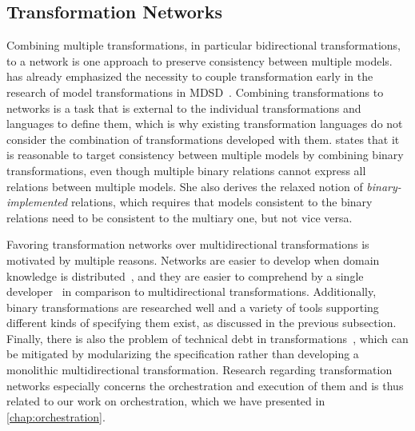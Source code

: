 \subsection{Transformation Networks}

Combining multiple transformations, in particular bidirectional transformations, to a network is one approach to preserve consistency between multiple models.
 has already emphasized the necessity to couple transformation early in the research of model transformations in \gls{MDSD}~\cite{laemmel2004coupledTransformations-WSET}.
Combining transformations to networks is a task that is external to the individual transformations and languages to define them, which is why existing transformation languages do not consider the combination of transformations developed with them.
\textcite{stevens2020BidirectionalTransformationLarge-SoSym} states that it is reasonable to target consistency between multiple models by combining binary transformations, even though multiple binary relations cannot express all relations between multiple models.
She also derives the relaxed notion of \emph{binary-implemented} relations, which requires that models consistent to the binary relations need to be consistent to the multiary one, but not vice versa.

Favoring transformation networks over multidirectional transformations is motivated by multiple reasons.
Networks are easier to develop when domain knowledge is distributed~\cite{klare2018docsym}, and they are easier to comprehend by a single developer~\cite{cleve2019dagstuhl, stevens2020BidirectionalTransformationLarge-SoSym} in comparison to multidirectional transformations.
Additionally, binary transformations are researched well and a variety of tools supporting different kinds of specifying them exist, as discussed in the previous subsection.
Finally, there is also the problem of technical debt in transformations~\cite{lano2018technicalDebt-ICMT}, which can be mitigated by modularizing the specification rather than developing a monolithic multidirectional transformation.
Research regarding transformation networks especially concerns the orchestration and execution of them and is thus related to our work on orchestration, which we have presented in \autoref{chap:orchestration}.

